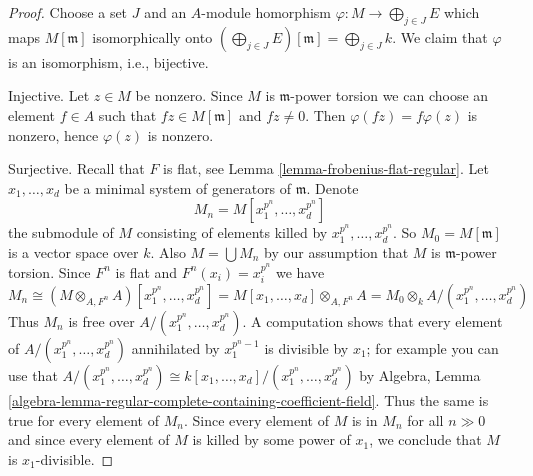\documentclass{stacks-project}
\theoremstyle{plain}
\theoremstyle{definition}
\theoremstyle{remark}
\numberwithin{equation}{subsection}
\begin{document}
\begin{proof}
Choose a set $J$ and an $A$-module homorphism
$\varphi : M \to \bigoplus_{j \in J} E$ which maps
$M[\mathfrak m]$ isomorphically onto
$(\bigoplus_{j \in J} E)[\mathfrak m] = \bigoplus_{j \in J} k$.
We claim that $\varphi$ is an isomorphism, i.e., bijective.

\medskip\noindent
Injective. Let $z \in M$ be nonzero. Since $M$ is $\mathfrak m$-power torsion
we can choose an element $f \in A$ such that $fz \in M[\mathfrak m]$ and
$fz \not = 0$. Then $\varphi(fz) = f\varphi(z)$ is nonzero, hence
$\varphi(z)$ is nonzero.

\medskip\noindent
Surjective. Recall that $F$ is flat, see
Lemma \ref{lemma-frobenius-flat-regular}.
Let $x_1, \ldots, x_d$ be a minimal system of generators of
$\mathfrak m$. Denote
$$
M_n = M[x_1^{p^n}, \ldots, x_d^{p^n}]
$$
the submodule of $M$ consisting of elements killed by
$x_1^{p^n}, \ldots, x_d^{p^n}$. So $M_0 = M[\mathfrak m]$
is a vector space over $k$. Also $M = \bigcup M_n$ by our
assumption that $M$ is $\mathfrak m$-power torsion. Since $F^n$ is flat and
$F^n(x_i) = x_i^{p^n}$ we have
$$
M_n \cong (M \otimes_{A, F^n} A)[x_1^{p^n}, \ldots, x_d^{p^n}] =
M[x_1, \ldots, x_d] \otimes_{A, F^n} A =
M_0 \otimes_k A/(x_1^{p^n}, \ldots, x_d^{p^n})
$$
Thus $M_n$ is free over $A/(x_1^{p^n}, \ldots, x_d^{p^n})$.
A computation shows that every element of $A/(x_1^{p^n}, \ldots, x_d^{p^n})$
annihilated by $x_1^{p^n - 1}$ is divisible by $x_1$; for example
you can use that $A/(x_1^{p^n}, \ldots, x_d^{p^n}) \cong
k[x_1, \ldots, x_d]/(x_1^{p^n}, \ldots, x_d^{p^n})$ by Algebra, Lemma
\ref{algebra-lemma-regular-complete-containing-coefficient-field}.
Thus the same is true for every element of $M_n$.
Since every element of $M$ is in $M_n$ for all $n \gg 0$
and since every element of $M$ is killed by some power of
$x_1$, we conclude that $M$ is $x_1$-divisible.


\end{proof}
\end{document}
